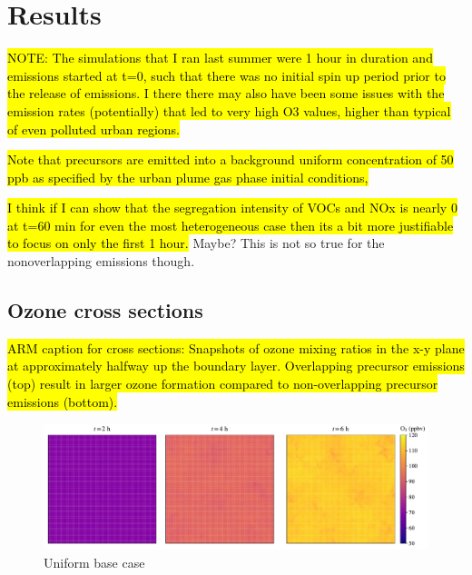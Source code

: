 
\section{Results}

\hl{NOTE: The simulations that I ran last summer were 1 hour in duration and emissions started at t=0, such that there was no initial spin up period prior to the release of emissions. I there there may also have been some issues with the emission rates (potentially) that led to very high O3 values, higher than typical of even polluted urban regions.}

\hl{Note that precursors are emitted into a background uniform concentration of 50 ppb as specified by the urban plume gas phase initial conditions,}

\hl{I think if I can show that the segregation intensity of VOCs and NOx is nearly 0 at t=60 min for even the most heterogeneous case then its a bit more justifiable to focus on only the first 1 hour.} Maybe? This is not so true for the nonoverlapping emissions though.

\subsection{Ozone cross sections}

\hl{ARM caption for cross sections: Snapshots of ozone mixing ratios in the x-y plane at approximately halfway up the boundary layer. Overlapping precursor emissions (top) result in larger ozone formation compared to non-overlapping precursor emissions (bottom).}

\begin{figure}[h]
    \centering
    \includegraphics[width=\textwidth]{figures/o3-crosssec-uniform-basecase-z25.pdf}
    \caption{Uniform base case}
  \end{figure}

